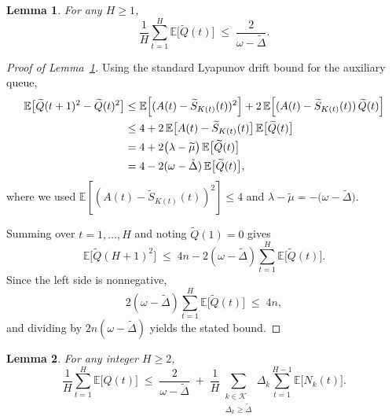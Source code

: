\documentclass[12pt,draftcls, onecolumn]{IEEEtran}
\newcommand{\vedisc}{\omega}
\newcommand{\EE}{\mathbb{E}}
\newtheorem{lemma}{Lemma}
\begin{document}
{\begin{lemma}\label{lem:bounding-Q-tilde}
For any \(H \ge 1\),
\[
\frac{1}{H} \sum_{t=1}^{H} \EE\bigl[\widetilde{Q}(t)\bigr]
\;\le\;
\frac{2}{\vedisc - \tilde{\Delta}}.
\]
\end{lemma}
\begin{proof}[Proof of Lemma~\ref{lem:bounding-Q-tilde}]
Using the standard Lyapunov drift bound for the auxiliary queue,
\begin{align*}
\EE\bigl[\widetilde{Q}(t+1)^2 - \widetilde{Q}(t)^2\bigr]
&\le
\EE\Bigl[(A(t) - \widetilde{S}_{K(t)}(t))^2\Bigr]
+2\,\EE\Bigl[(A(t)-\widetilde{S}_{K(t)}(t))\,\widetilde{Q}(t)\Bigr]\\
&\le
4 + 2\,\EE\bigl[A(t)-\widetilde{S}_{K(t)}(t)\bigr]\,\EE\bigl[\widetilde{Q}(t)\bigr]\\
&=
4 + 2\bigl(\lambda - \widetilde{\mu}\bigr)\,\EE\bigl[\widetilde{Q}(t)\bigr]\\
&=
4 - 2(\vedisc - \tilde{\Delta})\,\EE\bigl[\widetilde{Q}(t)\bigr],
\end{align*}
where we used \(\EE[(A(t)-\widetilde{S}_{K(t)}(t))^2]\le4\) and \(\lambda-\widetilde{\mu}=-\bigl(\vedisc-\tilde\Delta\bigr)\).

Summing over \(t=1,\dots,H\) and noting \(\widetilde{Q}(1)=0\) gives
\[
\EE\bigl[\widetilde{Q}(H+1)^2\bigr]
\;\le\;
4n - 2(\vedisc - \tilde{\Delta})\sum_{t=1}^{H}\EE\bigl[\widetilde{Q}(t)\bigr].
\]
Since the left side is nonnegative,
\[
2(\vedisc - \tilde{\Delta})\sum_{t=1}^{H}\EE\bigl[\widetilde{Q}(t)\bigr]
\;\le\;
4n,
\]
and dividing by \(2n(\vedisc - \tilde{\Delta})\) yields the stated bound.
\end{proof}

\begin{lemma}\label{Lemma:initialbound-main-lemma}
For any integer \(H\ge2\),
\[
\frac{1}{H}\sum_{t=1}^H \mathbb{E}\bigl[Q(t)\bigr]
\;\le\;
\frac{2}{\vedisc - \tilde{\Delta}}
\;+\;
\frac{1}{H}
\sum_{\substack{k\in\mathcal{K}\\\Delta_k \ge \tilde{\Delta}}}
\Delta_k
\sum_{t=1}^{H-1}\mathbb{E}\bigl[N_k(t)\bigr].
\]
\end{lemma}

}
\end{document}
